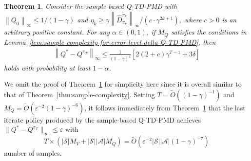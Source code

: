 \documentclass[10pt]{article}
\newcommand{\calA}{\mathcal{A}}
\newcommand{\calS}{\mathcal{S}}
\newcommand{\ls}{\left}
\newcommand{\rs}{\right}
\theoremstyle{plain}
\newtheorem{theorem}{Theorem}[section]
\theoremstyle{definition}
\begin{document}
\begin{theorem} Consider the sample-based Q-TD-PMD with $\ls\| Q_0 \rs\|_\infty \leq {1}/{(1-\gamma)}$ and  $  \eta_k \geq {\gamma\ls\| {\hat{D}}_{\pi_k}^{\tilde{\pi}_k} \rs\|_\infty}/{(c \cdot \gamma^{2k+1})},$
    where $c > 0$ is an arbitrary positive constant.
    For any $\alpha \in (0,1)$, if $M_Q$ satisfies the conditions in Lemma~\ref{lem:sample-complexity-for-error-level-delta-Q-TD-PMD}, then 
    \begin{align*}
\ls\| Q^*-Q^{\pi _T}\rs\| _{\infty}\le \frac{1}{\left( 1-\gamma \right) ^2}\left[ 2\left( 2+c \right) \gamma ^{T-1}+3\delta \right]
    \end{align*}
   holds with probability at least $1-\alpha$.
    \label{thm:sample-complexity-Q}
\end{theorem}
We omit the proof of Theorem~\ref{thm:sample-complexity-Q} for simplicity here since it is overall similar to that of Theorem~\ref{thm:sample-complexity}. Setting $T = \tilde{O}((1-\gamma)^{-1}
)$ and $M_Q=\tilde{O}(\varepsilon^{-2}(1-\gamma)^{-6})$, it follows immediately from Theorem~\ref{thm:sample-complexity-Q} that the last iterate policy produced by the sample-based Q-TD-PMD achieves $
\| Q^*-Q^{\pi _T}\| _{\infty}\le \varepsilon $ with 
\[
    T\times \ls(|\calS| M_V + |\calS||\calA| M_Q \rs) = \tilde{O} \ls( \varepsilon^{-2} |\calS||\calA| (1-\gamma)^{-7} \rs)
\]
number of samples. 





\end{document}

